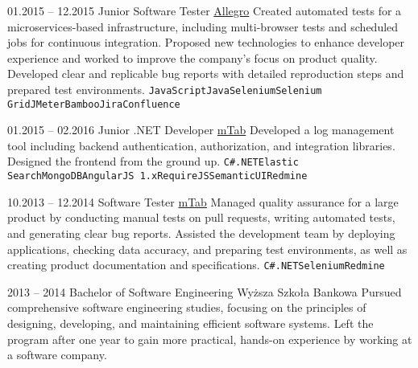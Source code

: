 \documentclass[9pt]{config}
\begin{document}
\begin{entrylist}
  \entry
  {01.2015 -- 12.2015}
  {Junior Software Tester}
  {\href{https://allegro.pl}{Allegro}}
  {Created automated tests for a microservices-based infrastructure,
    including multi-browser tests and scheduled jobs for continuous
    integration. Proposed new technologies to enhance developer
    experience and worked to improve the company's focus on product
    quality. Developed clear and replicable bug reports with detailed
  reproduction steps and prepared test environments.}
  {\texttt{JavaScript}\slashsep\texttt{Java}\slashsep\texttt{Selenium}\slashsep\texttt{Selenium
  Grid}\slashsep\texttt{JMeter}\slashsep\texttt{Bamboo}\slashsep\texttt{Jira}\slashsep\texttt{Confluence}}

  \entry
  {01.2015 -- 02.2016}
  {Junior .NET Developer}
  {\href{https://mtab.com}{mTab}}
  {Developed a log management tool including backend authentication,
    authorization, and integration libraries. Designed the frontend
  from the ground up.}
  {\texttt{C\#}\slashsep\texttt{.NET}\slashsep\texttt{Elastic
    Search}\slashsep\texttt{MongoDB}\slashsep\texttt{AngularJS
  1.x}\slashsep\texttt{RequireJS}\slashsep\texttt{SemanticUI}\slashsep\texttt{Redmine}}

  \entry
  {10.2013 -- 12.2014}
  {Software Tester}
  {\href{https://mtab.com}{mTab}}
  {Managed quality assurance for a large product by conducting manual
    tests on pull requests, writing automated tests, and generating
    clear bug reports. Assisted the development team by deploying
    applications, checking data accuracy, and preparing test
  environments, as well as creating product documentation and specifications.}
  {\texttt{C\#}\slashsep\texttt{.NET}\slashsep\texttt{Selenium}\slashsep\texttt{Redmine}}
\end{entrylist}

\newpage



\begin{entrylist}
  \entry
  {2013 -- 2014}
  {Bachelor of Software Engineering}
  {Wyższa Szkoła Bankowa}
  {Pursued comprehensive software engineering studies, focusing on
    the principles of designing, developing, and maintaining efficient
    software systems. Left the program after one year to gain more
  practical, hands-on experience by working at a software company.}
  {}
\end{entrylist}
\end{document}
